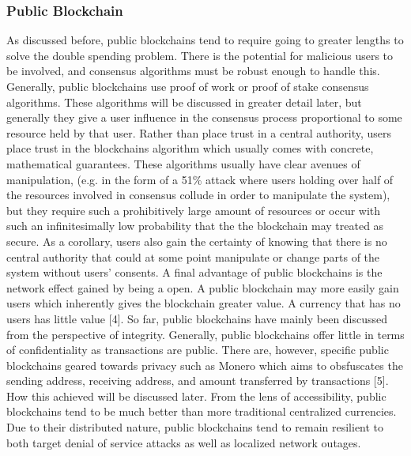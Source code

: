 \documentclass[11pt]{article}
\begin{document}
\subsubsection{Public Blockchain}
\label{sec:orgb5ff466}
As discussed before, public blockchains tend to require going to greater lengths to solve the double spending problem. There is the potential for malicious users to be involved, and consensus algorithms must be robust enough to handle this. Generally, public blockchains use proof of work or proof of stake consensus algorithms. These algorithms will be discussed in greater detail later, but generally they give a user influence in the consensus process proportional to some resource held by that user. Rather than place trust in a central authority, users place trust in the blockchains algorithm which usually comes with concrete, mathematical guarantees. These algorithms usually have clear avenues of manipulation, (e.g. in the form of a 51\% attack where users holding over half of the resources involved in consensus collude in order to manipulate the system), but they require such a prohibitively large amount of resources or occur with such an infinitesimally low probability that the the blockchain may treated as secure. As a corollary, users also gain the certainty of knowing that there is no central authority that could at some point manipulate or change parts of the system without users' consents. A final advantage of public blockchains is the network effect gained by being a open. A public blockchain may more easily gain users which inherently gives the blockchain greater value. A currency that has no users has little value [4]. 
So far, public blockchains have mainly been discussed from the perspective of integrity. Generally, public blockchains offer little in terms of confidentiality as transactions are public. There are, however, specific public blockchains geared towards privacy such as Monero which aims to obsfuscates the sending address, receiving address, and amount transferred by transactions [5]. How this achieved will be discussed later. From the lens of accessibility, public blockchains tend to be much better than more traditional centralized currencies. Due to their distributed nature, public blockchains tend to remain resilient to both target denial of service attacks as well as localized network outages.
\end{document}
